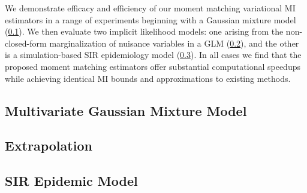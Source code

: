 We demonstrate efficacy and efficiency of our moment matching
variational MI estimators in a range of experiments beginning with a
Gaussian mixture model (\SEC\ref{sec:gmm}).  We then evaluate two
implicit likelihood models: one arising from the non-closed-form
marginalization of nuisance variables in a GLM
(\SEC\ref{sec:extrapolation}), and the other is a simulation-based SIR
epidemiology model (\SEC\ref{sec:sir}).  In all cases we find that the
proposed moment matching estimators offer substantial computational
speedups while achieving identical MI bounds and approximations to
existing methods.


% 

\subsection{Multivariate Gaussian Mixture Model}\label{sec:gmm}


\subsection{Extrapolation}\label{sec:extrapolation}


\subsection{SIR Epidemic Model}\label{sec:sir}


